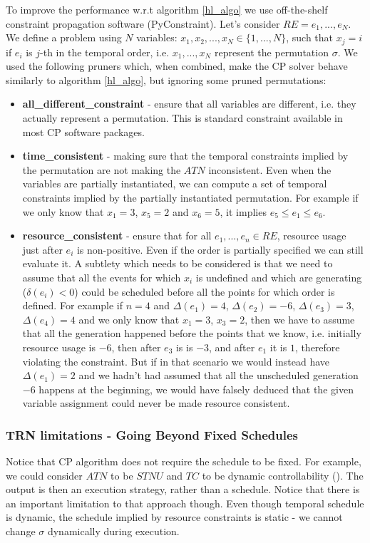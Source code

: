 To improve the performance w.r.t algorithm \ref{hl_algo} we use off-the-shelf constraint propagation software (PyConstraint). Let's consider $RE={e_1, ..., e_N}$. We define a problem using $N$ variables:  $x_1, x_2, ..., x_N \in \{ 1, ..., N \}$, such that $x_j=i$ if $e_i$ is $j$-th in the temporal order, i.e. $x_1, ..., x_N$ represent the permutation $\sigma$. We used the following pruners which, when combined, make the CP solver behave similarly to algorithm \ref{hl_algo}, but ignoring some pruned permutations:
\begin{itemize}
\setlength\itemsep{0.2em}
\item \textbf{all\_different\_constraint} - ensure that all variables are different, i.e. they actually represent a permutation. This is standard constraint available in most CP software packages.
\item \textbf{time\_consistent} - making sure that the temporal constraints implied by the permutation are not making the $ATN$ inconsistent. Even when the variables are partially instantiated, we can compute a set of temporal constraints implied by the partially instantiated permutation. For example if we only know that $x_1 = 3$, $x_5 = 2$ and $x_6=5$, it implies $e_5 \leq e_1 \leq e_6$.
\item \textbf{resource\_consistent} - ensure that for all $e_1, ..., e_n \in RE$, resource usage just after $e_i$ is non-positive. Even if the order is partially specified we can still evaluate it. A subtlety which needs to be considered is that we need to assume that all the events for which $x_i$ is undefined and which are generating ($\delta(e_i) < 0$) could be scheduled before all the points for which order is defined. For example if $n = 4$ and $\Delta(e_1) = 4$, $\Delta(e_2) = -6$, $\Delta(e_3) = 3$, $\Delta(e_4) = 4$ and we only know that $x_1 = 3$, $x_3 = 2$, then we have to assume that all the generation happened before the points that we know, i.e. initially resource usage is $-6$, then after $e_3$ is is $-3$, and after $e_1$ it is $1$, therefore violating the constraint. But if in that scenario we would instead have $\Delta(e_1) = 2$ and we hadn't had assumed that all the unscheduled generation $-6$ happens at the beginning, we would have falsely deduced that the given variable assignment could never be made resource consistent.
\end{itemize}

\subsubsection{TRN limitations - Going Beyond Fixed Schedules}
Notice that CP algorithm does not require the schedule to be fixed. For example, we could consider $ATN$ to be $STNU$ and $TC$ to be dynamic controllability (\cite{vidal1996dealing}). The output is then an execution strategy, rather than a schedule. Notice that there is an important limitation to that approach though. Even though temporal schedule is dynamic, the schedule implied by resource constraints is static - we cannot change $\sigma$ dynamically during execution.

